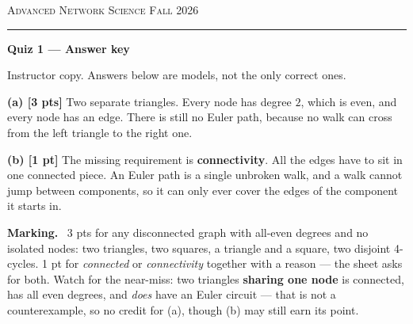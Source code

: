 \documentclass[a4paper, 12pt]{extarticle}
\newenvironment{grading}
  {\begin{tcolorbox}[colback=pltblue!4, colframe=pltblue!35, boxrule=0.5pt,
                     sharp corners, boxsep=2pt, left=6pt, right=6pt,
                     top=4pt, bottom=4pt]\small\textbf{Marking.}\ }
  {\end{tcolorbox}}
\begin{document}
{\footnotesize\textsc{Advanced Network Science} \hfill \textsc{Fall 2026}}\par
\vspace{-0.2em}\rule{\textwidth}{1pt}\par
\vspace{0.3em}
{\LARGE\bfseries Quiz 1 \; --- \; Answer key}\par
\vspace{0.1em}
{\small Instructor copy. Answers below are models, not the only correct ones.}\par
\vspace{0.8em}


\textbf{(a) [3 pts]} Two separate triangles. Every node has degree $2$, which
is even, and every node has an edge. There is still no Euler path, because no
walk can cross from the left triangle to the right one.

\begin{center}
\end{center}

\textbf{(b) [1 pt]} The missing requirement is \textbf{connectivity}. All the
edges have to sit in one connected piece. An Euler path is a single unbroken
walk, and a walk cannot jump between components, so it can only ever cover the
edges of the component it starts in.

\begin{grading}
3 pts for any disconnected graph with all-even degrees and no isolated nodes:
two triangles, two squares, a triangle and a square, two disjoint 4-cycles.
1 pt for \emph{connected} or \emph{connectivity} together with a reason --- the
sheet asks for both. Watch for the near-miss: two triangles \textbf{sharing one node} is
connected, has all even degrees, and \emph{does} have an Euler circuit ---
that is not a counterexample, so no credit for (a), though (b) may still earn
its point.
\end{grading}
\end{document}
